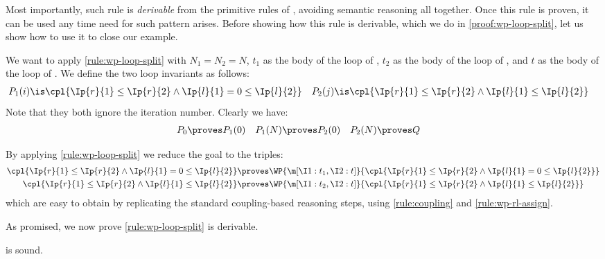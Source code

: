 \documentclass[acmsmall,nonacm,screen,appendix]{acmart}
\begin{document}
Most importantly, such rule is \emph{derivable} from the primitive rules of \thelogic, avoiding semantic reasoning all together.
Once this rule is proven, it can be used any time need for such pattern arises.
Before showing how this rule is derivable,
which we do in \cref{proof:wp-loop-split},
let us show how to use it to close our example.

We want to apply \ref{rule:wp-loop-split} with $N_1=N_2=N$,
$t_1$ as the body of the loop of ,
$t_2$ as the body of the loop of ,
and
$t$ as the body of the loop of .
We define the two loop invariants as follows:
\begin{align*}
  P_1(i) &\is
    \cpl{
      \Ip{r}{1}\leq\Ip{r}{2}
      \land
      \Ip{l}{1}=0\leq\Ip{l}{2}
    }
  &
  P_2(j) &\is
    \cpl{
      \Ip{r}{1}\leq\Ip{r}{2}
      \land
      \Ip{l}{1}\leq\Ip{l}{2}
    }
\end{align*}
Note that they both ignore the iteration number.
Clearly we have:
\begin{align*}
  P_0 &\proves P_1(0)
  &
  P_1(N) &\proves P_2(0)
  &
  P_2(N) &\proves Q
\end{align*}

By applying \ref{rule:wp-loop-split} we reduce the goal to the triples:
\begin{align*}
  \cpl{
    \Ip{r}{1}\leq\Ip{r}{2}
    \land
    \Ip{l}{1}=0\leq\Ip{l}{2}
  }
  &\proves
  \WP{\m[
    \I1: t_1,
    \I2: t
  ]}{
    \cpl{
      \Ip{r}{1}\leq\Ip{r}{2}
      \land
      \Ip{l}{1}=0\leq\Ip{l}{2}
    }
  }
  \\
  \cpl{
    \Ip{r}{1}\leq\Ip{r}{2}
    \land
    \Ip{l}{1}\leq\Ip{l}{2}
  }
  &\proves
  \WP{\m[
    \I1: t_2,
    \I2: t
  ]}{
    \cpl{
      \Ip{r}{1}\leq\Ip{r}{2}
      \land
      \Ip{l}{1}\leq\Ip{l}{2}
    }
  }
\end{align*}
which are easy to obtain by replicating the standard coupling-based reasoning
steps, using \ref{rule:coupling} and \ref{rule:wp-rl-assign}.

\medskip
As promised, we now prove \ref{rule:wp-loop-split} is derivable.
\begin{lemma}
\label{proof:wp-loop-split}
   is sound.
\end{lemma}
\end{document}
